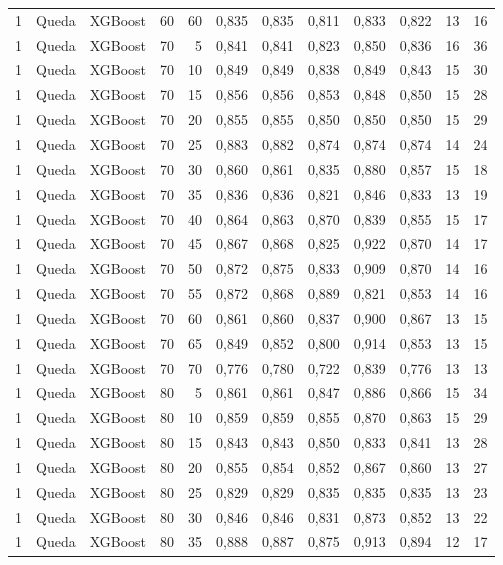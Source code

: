 \begin{longtable}{ccclrrrrrrrr}
1 & Queda & XGBoost & 60 & 60 & 0,835 & 0,835 & 0,811 & 0,833 & 0,822 & 13 & 16 \\
1 & Queda & XGBoost & 70 & 5 & 0,841 & 0,841 & 0,823 & 0,850 & 0,836 & 16 & 36 \\
1 & Queda & XGBoost & 70 & 10 & 0,849 & 0,849 & 0,838 & 0,849 & 0,843 & 15 & 30 \\
1 & Queda & XGBoost & 70 & 15 & 0,856 & 0,856 & 0,853 & 0,848 & 0,850 & 15 & 28 \\
1 & Queda & XGBoost & 70 & 20 & 0,855 & 0,855 & 0,850 & 0,850 & 0,850 & 15 & 29 \\
1 & Queda & XGBoost & 70 & 25 & 0,883 & 0,882 & 0,874 & 0,874 & 0,874 & 14 & 24 \\
1 & Queda & XGBoost & 70 & 30 & 0,860 & 0,861 & 0,835 & 0,880 & 0,857 & 15 & 18 \\
1 & Queda & XGBoost & 70 & 35 & 0,836 & 0,836 & 0,821 & 0,846 & 0,833 & 13 & 19 \\
1 & Queda & XGBoost & 70 & 40 & 0,864 & 0,863 & 0,870 & 0,839 & 0,855 & 15 & 17 \\
1 & Queda & XGBoost & 70 & 45 & 0,867 & 0,868 & 0,825 & 0,922 & 0,870 & 14 & 17 \\
1 & Queda & XGBoost & 70 & 50 & 0,872 & 0,875 & 0,833 & 0,909 & 0,870 & 14 & 16 \\
1 & Queda & XGBoost & 70 & 55 & 0,872 & 0,868 & 0,889 & 0,821 & 0,853 & 14 & 16 \\
1 & Queda & XGBoost & 70 & 60 & 0,861 & 0,860 & 0,837 & 0,900 & 0,867 & 13 & 15 \\
1 & Queda & XGBoost & 70 & 65 & 0,849 & 0,852 & 0,800 & 0,914 & 0,853 & 13 & 15 \\
1 & Queda & XGBoost & 70 & 70 & 0,776 & 0,780 & 0,722 & 0,839 & 0,776 & 13 & 13 \\
1 & Queda & XGBoost & 80 & 5 & 0,861 & 0,861 & 0,847 & 0,886 & 0,866 & 15 & 34 \\
1 & Queda & XGBoost & 80 & 10 & 0,859 & 0,859 & 0,855 & 0,870 & 0,863 & 15 & 29 \\
1 & Queda & XGBoost & 80 & 15 & 0,843 & 0,843 & 0,850 & 0,833 & 0,841 & 13 & 28 \\
1 & Queda & XGBoost & 80 & 20 & 0,855 & 0,854 & 0,852 & 0,867 & 0,860 & 13 & 27 \\
1 & Queda & XGBoost & 80 & 25 & 0,829 & 0,829 & 0,835 & 0,835 & 0,835 & 13 & 23 \\
1 & Queda & XGBoost & 80 & 30 & 0,846 & 0,846 & 0,831 & 0,873 & 0,852 & 13 & 22 \\
1 & Queda & XGBoost & 80 & 35 & 0,888 & 0,887 & 0,875 & 0,913 & 0,894 & 12 & 17 \\

\end{longtable}
